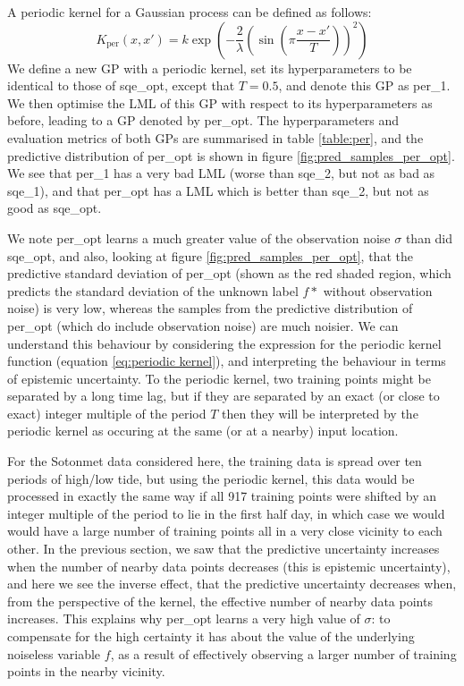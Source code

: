 A periodic kernel for a Gaussian process can be defined as follows:
\begin{equation}
    K_\mathrm{per}(x, x') = k \exp\left( -\frac{2}{\lambda} \left( \sin \left( \pi \frac{x-x'}{T} \right) \right)^2 \right) \label{eq:periodic kernel}
\end{equation}
We define a new GP with a periodic kernel, set its hyperparameters to be identical to those of sqe\_opt, except that $T=0.5$, and denote this GP as per\_1. We then optimise the LML of this GP with respect to its hyperparameters as before, leading to a GP denoted by per\_opt. The hyperparameters and evaluation metrics of both GPs are summarised in table \ref{table:per}, and the predictive distribution of per\_opt is shown in figure \ref{fig:pred_samples_per_opt}. We see that per\_1 has a very bad LML (worse than sqe\_2, but not as bad as sqe\_1), and that per\_opt has a LML which is better than sqe\_2, but not as good as sqe\_opt.

We note per\_opt learns a much greater value of the observation noise $\sigma$ than did sqe\_opt, and also, looking at figure \ref{fig:pred_samples_per_opt}, that the predictive standard deviation of per\_opt (shown as the red shaded region, which predicts the standard deviation of the unknown label $f*$ without observation noise) is very low, whereas the samples from the predictive distribution of per\_opt (which do include observation noise) are much noisier. We can understand this behaviour by considering the expression for the periodic kernel function (equation \ref{eq:periodic kernel}), and interpreting the behaviour in terms of epistemic uncertainty. To the periodic kernel, two training points might be separated by a long time lag, but if they are separated by an exact (or close to exact) integer multiple of the period $T$ then they will be interpreted by the periodic kernel as occuring at the same (or at a nearby) input location.

For the Sotonmet data considered here, the training data is spread over ten periods of high/low tide, but using the periodic kernel, this data would be processed in exactly the same way if all 917 training points were shifted by an integer multiple of the period to lie in the first half day, in which case we would would have a large number of training points all in a very close vicinity to each other. In the previous section, we saw that the predictive uncertainty increases when the number of nearby data points decreases (this is epistemic uncertainty), and here we see the inverse effect, that the predictive uncertainty decreases when, from the perspective of the kernel, the effective number of nearby data points increases. This explains why per\_opt learns a very high value of $\sigma$: to compensate for the high certainty it has about the value of the underlying noiseless variable $f$, as a result of effectively observing a larger number of training points in the nearby vicinity.

